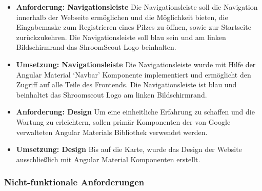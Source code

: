 \begin{itemize}
	\item \textbf{Anforderung: Navigationsleiste}
	      Die Navigationsleiste soll die Navigation innerhalb der Webseite ermöglichen und die Möglichkeit bieten, die Eingabemaske zum Registrieren eines
	      Pilzes zu öffnen, sowie zur Startseite zurückzukehren. Die Navigationsleiste soll blau sein und am linken Bildschirmrand das ShroomScout Logo
	      beinhalten.

	\item \textbf{Umsetzung: Navigationsleiste}
	      Die Navigationsleiste wurde mit Hilfe der Angular Material `Navbar' Komponente implementiert und ermöglicht den Zugriff auf alle Teile des Frontends.
	      Die Navigationsleiste ist blau und beinhaltet das Shroomscout Logo am linken Bildschirmrand.

	\item \textbf{Anforderung: Design}
	      Um eine einheitliche Erfahrung zu schaffen und die Wartung zu erleichtern, sollen primär Komponenten der von Google verwalteten Angular Materials
	      Bibliothek verwendet werden.

	\item \textbf{Umsetzung: Design}
	      Bis auf die Karte, wurde das Design der Website ausschließlich mit Angular Material Komponenten erstellt.

\end{itemize}

\subsubsection{Nicht-funktionale Anforderungen}

